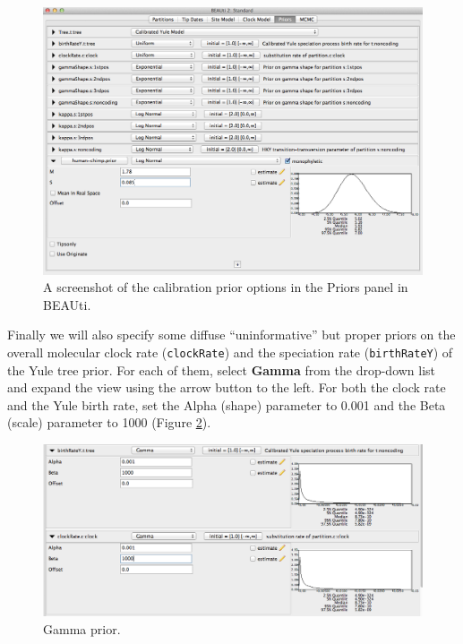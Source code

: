 \documentclass[11pt]{article}
\theoremstyle{plain}%
\theoremstyle{definition}
\theoremstyle{remark}
\begin{document}

\begin{figure}
\includegraphics[width=\textwidth]{figures/BEAUti_Prior2}
\caption{A screenshot of the calibration prior options in the Priors panel in BEAUti.}
\label{fig:BEAUti_Prior2}
\end{figure}

Finally we will also specify some diffuse ``uninformative'' but proper priors on the overall molecular clock rate (\texttt{clockRate}) and the speciation rate (\texttt{birthRateY}) of the Yule tree prior. For each of them, select \textbf{Gamma} from the drop-down list and expand the view using the arrow button to the left. For both the clock rate and the Yule birth rate, set the Alpha (shape) parameter to 0.001 and the Beta (scale) parameter to 1000 (Figure \ref{fig:GammaPrior}).

\begin{figure}
\includegraphics[width=\textwidth]{figures/GammaPrior}
\caption{Gamma prior.}
\label{fig:GammaPrior}
\end{figure}
\end{document}
